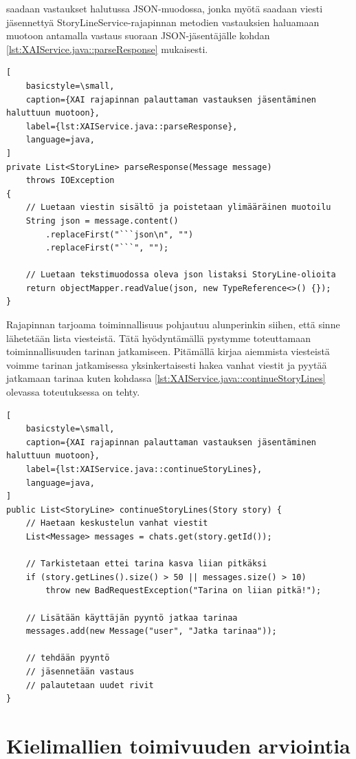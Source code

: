 saadaan vastaukset halutussa JSON-muodossa, jonka myötä saadaan viesti
jäsennettyä StoryLineService-rajapinnan metodien vastauksien haluamaan
muotoon antamalla vastaus suoraan JSON-jäsentäjälle kohdan
\ref{lst:XAIService.java::parseResponse} mukaisesti.

\begin{lstlisting}[
    basicstyle=\small,
    caption={XAI rajapinnan palauttaman vastauksen jäsentäminen haluttuun muotoon},
    label={lst:XAIService.java::parseResponse},
    language=java,
]
private List<StoryLine> parseResponse(Message message)
    throws IOException
{
    // Luetaan viestin sisältö ja poistetaan ylimääräinen muotoilu
    String json = message.content()
        .replaceFirst("```json\n", "")
        .replaceFirst("```", "");

    // Luetaan tekstimuodossa oleva json listaksi StoryLine-olioita
    return objectMapper.readValue(json, new TypeReference<>() {});
}
\end{lstlisting}

Rajapinnan tarjoama toiminnallisuus pohjautuu alunperinkin siihen, että sinne
lähetetään lista viesteistä. Tätä hyödyntämällä pystymme toteuttamaan
toiminnallisuuden tarinan jatkamiseen. Pitämällä kirjaa aiemmista viesteistä
voimme tarinan jatkamisessa yksinkertaisesti hakea vanhat viestit ja pyytää
jatkamaan tarinaa kuten kohdassa \ref{lst:XAIService.java::continueStoryLines}
olevassa toteutuksessa on tehty.

\begin{lstlisting}[
    basicstyle=\small,
    caption={XAI rajapinnan palauttaman vastauksen jäsentäminen haluttuun muotoon},
    label={lst:XAIService.java::continueStoryLines},
    language=java,
]
public List<StoryLine> continueStoryLines(Story story) {
    // Haetaan keskustelun vanhat viestit
    List<Message> messages = chats.get(story.getId());

    // Tarkistetaan ettei tarina kasva liian pitkäksi
    if (story.getLines().size() > 50 || messages.size() > 10)
        throw new BadRequestException("Tarina on liian pitkä!");

    // Lisätään käyttäjän pyyntö jatkaa tarinaa
    messages.add(new Message("user", "Jatka tarinaa"));

    // tehdään pyyntö
    // jäsennetään vastaus
    // palautetaan uudet rivit
}
\end{lstlisting}

\section{Kielimallien toimivuuden arviointia}

